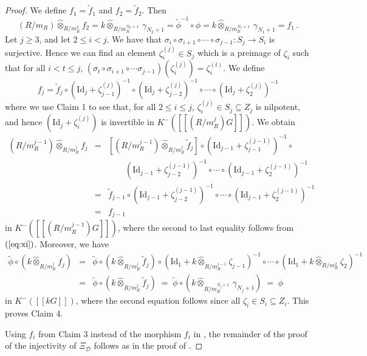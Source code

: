 \documentclass{amsart}
\theoremstyle{plain}
\theoremstyle{definition}
\theoremstyle{remark}
\begin{document}
\begin{proof}
We define $f_1=\tilde{f}_1$ and $f_2=\tilde{f}_2$. Then
$$(R/m_R)\hat{\otimes}_{R/m_R^{2}}f_2=k\hat{\otimes}_{R/m_R^{N_2+1}}\,\gamma_{N_2+1}
=\widetilde{\phi}^{-1}\circ\phi=k\hat{\otimes}_{R/m_R^{N_1+1}}\,\gamma_{N_1+1}=f_1\,.$$
Let $j\ge 3$, and let $2\le i< j$. We have that 
$\sigma_i\circ\sigma_{i+1}\circ\cdots\circ\sigma_{j-1}:S_j\to S_i$ is surjective. Hence we can
find an element $\zeta_i^{(j)}\in S_j$ which is a preimage of $\zeta_i$ such that
for all $i< t\le j$, $\left(\sigma_t\circ\sigma_{i+1}\circ\cdots\sigma_{j-1}\right)(\zeta_i^{(j)})=\zeta_i^{(t)}$. We define
$$f_j=\tilde{f}_j\circ (\mathrm{Id}_j+\zeta_{j-1}^{(j)})^{-1}\circ (\mathrm{Id}_j+\zeta_{j-2}^{(j)})^{-1}\circ\cdots\circ
(\mathrm{Id}_j+\zeta_2^{(j)})^{-1}$$
where we use Claim 1 to see that,  for all $2\le i\le j$, $\zeta_i^{(j)}\in S_j\subseteq Z_j$ is nilpotent, 
and hence $(\mathrm{Id}_j+\zeta_{i}^{(j)})$ is invertible in $K^-([[(R/m_R^j)G]])$.
We obtain
\begin{eqnarray*}
(R/m_R^{j-1})\hat{\otimes}_{R/m_R^{j}}f_j&=&
\left[(R/m_R^{j-1})\hat{\otimes}_{R/m_R^{j}}\tilde{f}_j\right]\circ 
(\mathrm{Id}_{j-1}+\zeta_{j-1}^{(j-1)})^{-1}\circ \\
&&\qquad(\mathrm{Id}_{j-1}+\zeta_{j-2}^{(j-1)})^{-1}\circ\cdots\circ(\mathrm{Id}_{j-1}+\zeta_2^{(j-1)})^{-1}\\
&=&\tilde{f}_{j-1}\circ (\mathrm{Id}_{j-1}+\zeta_{j-2}^{(j-1)})^{-1}\circ \cdots\circ(\mathrm{Id}_{j-1}+\zeta_2^{(j-1)})^{-1}\\
&=&f_{j-1}
\end{eqnarray*}
in $K^-([[(R/m_R^{j-1})G]])$, where the second to last equality follows from $(\ref{eq:xi})$. Moreover, we have 
\begin{eqnarray*}
\widetilde{\phi}\circ(k\hat{\otimes}_{R/m_R^{j}}f_{j})&=&
\widetilde{\phi}\circ(k\hat{\otimes}_{R/m_R^{j}}\tilde{f}_j)\circ 
(\mathrm{Id}_{1}+k\hat{\otimes}_{R/m_R^{j-1}}\zeta_{j-1})^{-1}\circ \cdots\circ(\mathrm{Id}_{1}+k\hat{\otimes}_{R/m_R^{2}}\zeta_2)^{-1}\\
&=&\widetilde{\phi}\circ(k\hat{\otimes}_{R/m_R^{j}}\tilde{f}_j)\;=\;
\widetilde{\phi}\circ(k\hat{\otimes}_{R/m_R^{N_j+1}}\,\gamma_{N_j+1})\;=\;\phi
\end{eqnarray*}
in $K^-([[kG]])$, where the second equation follows since all $\zeta_i\in S_i\subseteq Z_i$. 
This proves Claim 4.

\medskip

Using $f_i$ from Claim 3 instead of the morphism $f_i$ in \cite[Eq. (7.5)]{bcderived}, the remainder of the proof of the injectivity of $\Xi_\mathcal{D}$ follows as in the proof of
\cite[Prop. 7.2]{bcderived}.
\end{proof}
\end{document}
